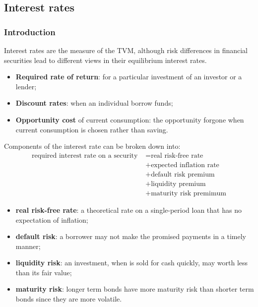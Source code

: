 \subsection{Interest rates}

\subsubsection{Introduction}
Interest rates are the measure of the TVM, although risk differences in financial securities lead to different views in their equilibrium interest rates. 
\begin{itemize}
	\setlength\itemsep{0em}
	\item \textbf{Required rate of return}: for a particular investment of an investor or a lender;
	\item \textbf{Discount rates}: when an individual borrow funds;
	\item \textbf{Opportunity cost} of current consumption: the opportunity forgone when current consumption is chosen rather than saving. 
\end{itemize}

Components of the interest rate can be broken down into:
\begin{align*}
    \text{required interest rate on a security } &=  \text{real risk-free rate} \\
      &+ \text{expected inflation rate}\\
      &+ \text{default risk premium}   \\
      &+ \text{liquidity premium}      \\
      &+ \text{maturity risk premimum} 
\end{align*}
\begin{itemize}
	\setlength\itemsep{0em}
	\item \textbf{real risk-free rate}: a theoretical rate on a single-period loan that has no expectation of inflation;
	\item \textbf{default risk}: a borrower may not make the promised payments in a timely manner;
	\item \textbf{liquidity risk}: an investment, when is sold for cash quickly, may worth less than its fair value;
	\item \textbf{maturity risk}: longer term bonds have more maturity risk than shorter term bonds since they are more volatile. 
\end{itemize}



